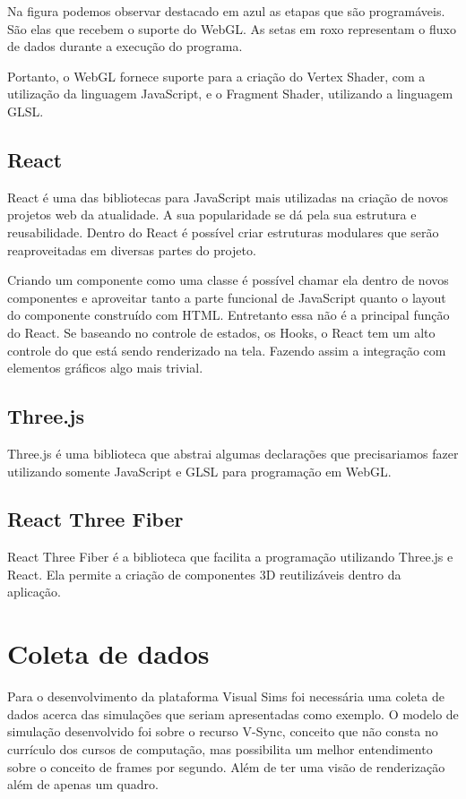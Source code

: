 \documentclass[tcc,capa]{texufpel}
\begin{document}
Na figura podemos observar destacado em azul as etapas que são programáveis. São elas que recebem o suporte do WebGL. As setas em roxo representam o fluxo de dados durante a execução do programa. 

Portanto, o WebGL fornece suporte para a criação do Vertex Shader, com a utilização da linguagem JavaScript, e o Fragment Shader, utilizando a linguagem GLSL. 

\subsection{React}

React é uma das bibliotecas para JavaScript mais utilizadas na criação de novos projetos web da atualidade. A sua popularidade se dá pela sua estrutura e reusabilidade. Dentro do React é possível criar estruturas modulares que serão reaproveitadas em diversas partes do projeto. 

Criando um componente como uma classe é possível chamar ela dentro de novos componentes e aproveitar tanto a parte funcional de JavaScript quanto o layout do componente construído com HTML. Entretanto essa não é a principal função do React. Se baseando no controle de estados, os Hooks, o React tem um alto controle do que está sendo renderizado na tela. Fazendo assim a integração com elementos gráficos algo mais trivial.

\subsection{Three.js}

Three.js é uma biblioteca que abstrai algumas declarações que precisariamos fazer utilizando somente JavaScript e GLSL para programação em WebGL. 

\subsection{React Three Fiber}

React Three Fiber é a biblioteca que facilita a programação utilizando Three.js e React. Ela permite a criação de componentes 3D reutilizáveis dentro da aplicação.

\section{Coleta de dados}

Para o desenvolvimento da plataforma Visual Sims foi necessária uma coleta de dados acerca das simulações que seriam apresentadas como exemplo. O modelo de simulação desenvolvido foi sobre o recurso V-Sync, conceito que não consta no currículo dos cursos de computação, mas possibilita um melhor entendimento sobre o conceito de frames por segundo. Além de ter uma visão de renderização além de apenas um quadro.
\end{document}
